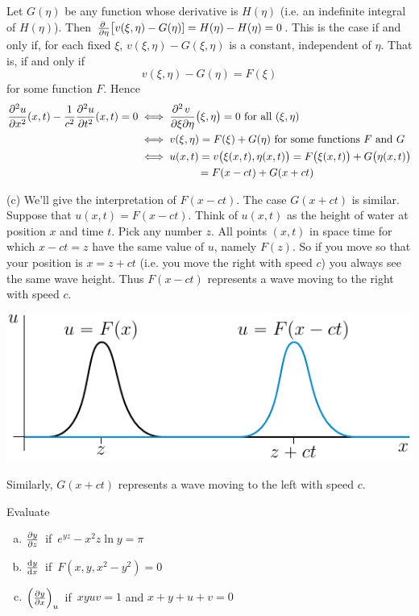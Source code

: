 \begin{solution}
Let $G(\eta)$ be any function whose derivative is $H(\eta)$
(i.e. an indefinite integral of $H(\eta)$). Then 
$\pdiff{}{\eta}\big[v(\xi,\eta)-G(\eta)]=H(\eta)-H(\eta)=0$. 
This is the case if and only if, for each fixed $\xi$, 
$v(\xi,\eta)-G(\xi,\eta)$  is a constant, independent of $\eta$. That is, 
if and  only if 
\begin{equation*}
v(\xi,\eta)-G(\eta)=F(\xi)
\end{equation*}  
for some function $F$. Hence
\begin{align*}
\frac{\partial^2 u}{\partial x^2}(x,t)
-\frac{1}{c^2}\frac{\partial^2 u}{\partial t^2}(x,t)=0
&\iff
\frac{\partial^2\hfil v\hfil\,}{\partial\xi\partial\eta}
      \big(\xi,\eta\big)=0\text{ for all }(\xi,\eta)\\
&\iff v(\xi,\eta)=F(\xi)+G(\eta)\text{ for some functions $F$ and $G$}\\
&\iff u(x,t)=v\big(\xi(x,t),\eta(x,t)\big)
=F\big(\xi(x,t)\big)+G\big(\eta(x,t)\big)\\
&\phantom{\iff u(x,t)\,}=F(x-ct)+G(x+ct)
\end{align*}

(c)
We'll give the interpretation of $F(x-ct)$. The case $G(x+ct)$ is similar.
Suppose that $u(x,t)=F(x-ct)$. Think of $u(x,t)$ as the height of water
at position $x$ and time $t$. Pick any number $z$. All points $(x,t)$
in space time for which $x-ct=z$ have the same value of $u$, namely $F(z)$.
So if you move so that your position is $x=z+ct$ (i.e. you move the right 
with speed $c$) you always see the same wave height. Thus $F(x-ct)$
represents a wave moving to the right with speed $c$. 
\begin{center}
   \includegraphics{fig/packet.pdf}
\end{center}
Similarly, $G(x+ct)$ represents a wave moving to the left with speed $c$.

\end{solution}

\begin{question}
 Evaluate 
\begin{enumerate}[(a)]
\item
$\pdiff{y}{z}$\ if\ $e^{yz}-x^2 z \ln y = \pi$
\item
$\diff{y}{x}$\ if\ $F(x,y,x^2-y^2)=0$
\item
$\left(\pdiff{y}{x}\right)_u$\ if\
$xyuv=1$ and $x+y+u+v=0$ 
\end{enumerate}
\end{question}

